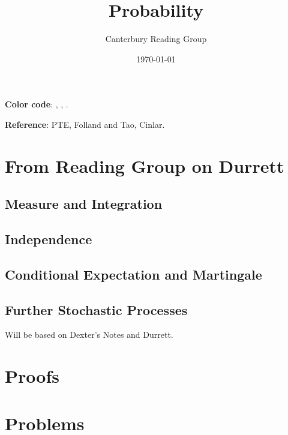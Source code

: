 \documentclass[12pt, oneside]{book}
\begin{document}
    \title{Probability}\author{Canterbury Reading Group}\date{\today}
    \setcounter{tocdepth}{3}
    \tableofcontents

    \textbf{Color code}: , , . 

    \textbf{Reference}: PTE, Folland and Tao, Cinlar.
    \chapter{From Reading Group on Durrett}  
        \section{Measure and Integration}
        \section{Independence}
        \section{Conditional Expectation and Martingale}
        \section{Further Stochastic Processes}Will be based on Dexter's Notes and Durrett.
    \appendix 
    \chapter{Proofs}
    \chapter{Problems}
\end{document}
